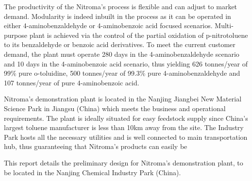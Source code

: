 The productivity of the Nitroma's process is flexible and can adjust to market demand. Modularity is indeed inbuilt in the process as it can be operated in either 4-aminobenzaldehyde or 4-aminobenzoic acid focused scenarios. Multi-purpose plant is achieved via the control of the partial oxidation of p-nitrotoluene to its benzaldehyde or benzoic acid derivatives. To meet the current customer demand, the plant must operate 280 days in the 4-aminobenzaldehyde scenario and 10 days in the 4-aminobenzoic acid scenario, thus yielding 626 tonnes/year of 99\% pure o-toluidine, 500 tonnes/year of 99.3\% pure 4-aminobenzaldehyde and 107 tonnes/year of pure 4-aminobenzoic acid.

Nitroma's demonstration plant is located in the Nanjing Jiangbei New Material Science Park in Jiangsu (China) which meets the business and operational requirements. The plant is ideally situated for easy feedstock supply since China’s largest toluene manufacturer is less than 10km away from the site. The Industry Park hosts all the necessary utilities and is well connected to main transportation hub, thus guaranteeing that Nitroma's products can easily be 



This report details the preliminary design for Nitroma’s demonstration plant, to be located in the Nanjing Chemical Industry Park (China).







